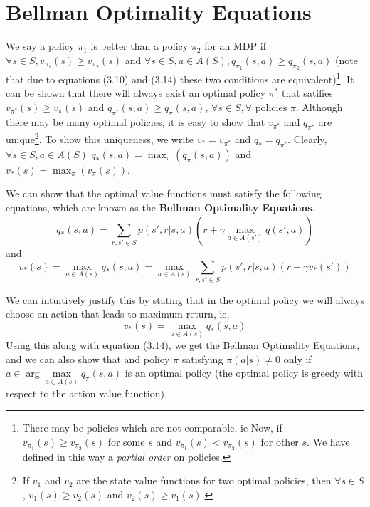 \documentclass[12pt]{report}
\begin{document}
\section{Bellman Optimality Equations}
We say a policy $\pi_{1}$ is better than a policy $\pi_{2}$ for an MDP if $\forall s \in S, v_{\pi_{1}}(s) \geq v_{\pi_{2}}(s)$ and $\forall s \in S, a \in A(S), q_{\pi_{1}}(s, a) \geq q_{\pi_{2}}(s, a)$ (note that due to equations (3.10) and (3.14) these two conditions are equivalent)\footnote{There may be policies which are not comparable, ie Now, if $v_{\pi_{1}}(s) \geq v_{\pi_{2}}(s)$ for some $s$ and $v_{\pi_{1}}(s) < v_{\pi_{2}}(s)$ for other $s$. We have defined in this way a \textit{partial order} on policies.}.
It can be shown that there will always exist an optimal policy $\pi^{*}$ that satifies $v_{\pi^{*}}(s) \geq v_{\pi}(s)$ and $q_{\pi^{*}}(s, a) \geq q_{\pi}(s, a)$, $\forall s \in S, \forall \text{ policies } \pi$. Although there may be many optimal policies, it is easy to show that $v_{\pi^{*}}$ and $q_{\pi^{*}}$ are unique\footnote{If $v_{1}$ and $v_{2}$ are the state value functions for two optimal policies, then $\forall s \in S$, $v_{1}(s) \geq v_{2}(s)$ and $v_{2}(s) \geq v_{1}(s)$.}. To show this uniqueness, we write $v_{*} = v_{\pi^{*}}$ and $q_{*} = q_{\pi^{*}}$.
Clearly, $\forall s \in S, a \in A(S)$ $q_{*}(s, a) = \max_{\pi}(q_{\pi}(s, a))$ and $v_{*}(s) = \max_{\pi}(v_{\pi}(s))$.

We can show that the optimal value functions must satisfy the following equations, which are known as the \textbf{Bellman Optimality Equations}.
\begin{equation}
    q_{*}(s, a) = \sum\limits_{r, s' \in S} p(s', r | s, a)(r + \gamma \max_{a \in A(s')} q(s', a))
\end{equation}
and
\begin{equation}
    v_{*}(s) = \max_{a \in A(s)} q_{*}(s, a) = \max_{a \in A(s)} \sum\limits_{r, s' \in S} p(s', r | s, a)(r + \gamma v_{*}(s'))
\end{equation}

We can intuitively justify this by stating that in the optimal policy we will always choose an action that leads to maximum return, ie, 
\begin{equation}
    v_{*}(s) = \max\limits_{a \in A(s)} q_{*}(s, a)
\end{equation}
Using this along with equation (3.14), we get the Bellman Optimality Equations, and we can also show that and policy $\pi$ satisfying $\pi(a | s) \neq 0$ only if $a \in \arg\max\limits_{a \in A(s)} q_{\pi}(s, a)$ is an optimal policy (the optimal policy is greedy with respect to the action value function).
\end{document}
